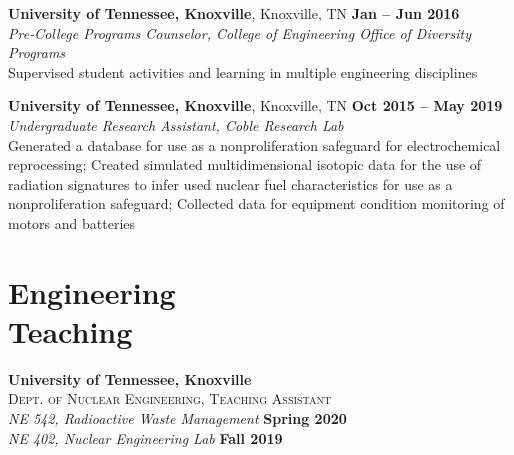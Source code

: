 \documentclass[margin,line]{resume}
\begin{document}
\begin{resume}
    \textbf{University of Tennessee, Knoxville}, Knoxville, TN \hfill \textbf{Jan -- Jun 2016}\vspace{1mm}\\
                \textsl{Pre-College Programs Counselor, College of Engineering Office of Diversity Programs}\\
                Supervised student activities and learning in multiple engineering disciplines

    \textbf{University of Tennessee, Knoxville}, Knoxville, TN \hfill \textbf{Oct 2015 -- May 2019}\vspace{1mm}\\
                \textsl{Undergraduate Research Assistant, Coble Research Lab}\\
                Generated a database for use as a nonproliferation safeguard for electrochemical reprocessing;
                Created simulated multidimensional isotopic data for the use of radiation signatures to infer 
                used nuclear fuel characteristics for use as a nonproliferation safeguard;
                Collected data for equipment condition monitoring of motors and batteries

    \section{\mysidestyle Engineering\\Teaching}
    \textbf{University of Tennessee, Knoxville}\\
    \textsc{Dept. of Nuclear Engineering, Teaching Assistant}\\
               \textsl{NE 542, Radioactive Waste Management} \hfill \textbf{Spring 2020}\\
               \textsl{NE 402, Nuclear Engineering Lab} \hfill \textbf{Fall 2019}
               \vspace{2mm}


\end{resume}
\end{document}
